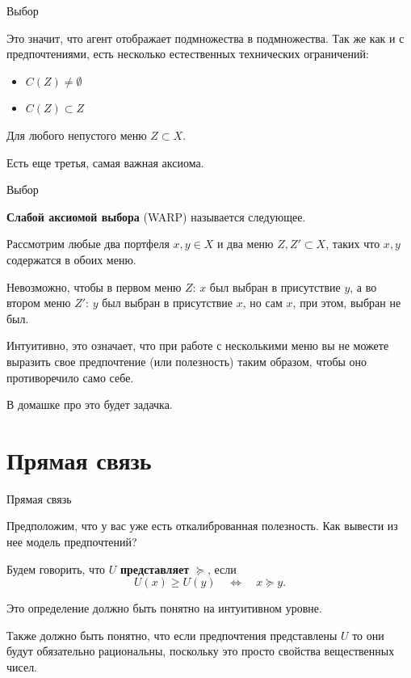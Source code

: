 \documentclass{beamer}
\begin{document}
\begin{frame}{Выбор}

Это значит, что агент отображает подмножества в подмножества. Так же как и с предпочтениями, есть несколько естественных технических ограничений:

\begin{itemize}
  \item $C(Z) \neq \emptyset$
  \item $C(Z) \subset Z$
\end{itemize}

Для любого непустого меню $Z \subset X$. 

Есть еще третья, самая важная аксиома.

\end{frame}

\begin{frame}{Выбор}

\textbf{Слабой аксиомой выбора} (WARP) называется следующее. 

\begin{definition} 
Рассмотрим любые два портфеля $x, y \in X$ и два меню $Z,Z' \subset X$, таких что $x,y$ содержатся в обоих меню.

Невозможно, чтобы в первом меню $Z$: $x$ был выбран в присутствие $y$, а во втором меню $Z'$: $y$ был выбран в присутствие $x$, но сам $x$, при этом,  выбран не был.
\end{definition}

Интуитивно, это означает, что при работе с несколькими меню вы не можете выразить свое предпочтение (или полезность) таким образом, чтобы оно противоречило само себе.

В домашке про это будет задачка.

\end{frame}

\section{Прямая связь}

\begin{frame}{Прямая связь}

Предположим, что у вас уже есть откалиброванная полезность. Как вывести из нее модель предпочтений?

\begin{definition}
Будем говорить, что $U$ \textbf{представляет} $\succcurlyeq$, если
$$ U(x) \geqslant U(y) \quad \Leftrightarrow \quad  x \succcurlyeq y.$$
\end{definition}

Это определение должно быть понятно на интуитивном уровне. 

Также должно быть понятно, что если предпочтения представлены $U$ то они будут обязательно рациональны, поскольку это просто свойства вещественных чисел.

\end{frame}
\end{document}
